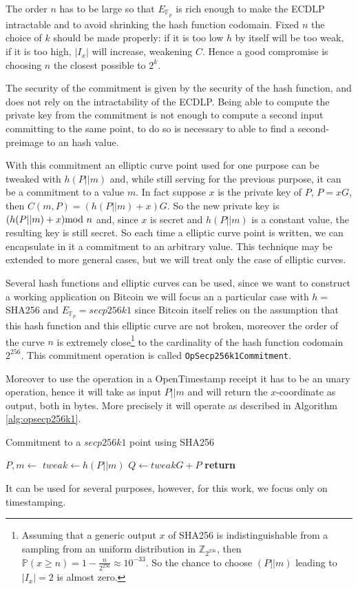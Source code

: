 The order $n$ has to be large so that $E_{\mathbb{F}_p}$ is rich enough to make the ECDLP intractable and to avoid shrinking the hash function codomain. Fixed $n$ the choice of $k$ should be made properly: if it is too low $h$ by itself will be too weak, if it is too high, $|I_x|$ will increase, weakening $C$. Hence a good compromise is choosing $n$ the closest possible to $2^k$.

The security of the commitment is given by the security of the hash function, and does not rely on the intractability of the ECDLP. Being able to compute the private key from the commitment is not enough to compute a second input committing to the same point, to do so is necessary to able to find a second-preimage to an hash value.

With this commitment an elliptic curve point used for one purpose can be tweaked with $h(P||m)$ and, while still serving for the previous purpose, it can be a commitment to a value $m$. In fact suppose $x$ is the private key of $P$, $P=xG$, then $C(m,P)=(h(P||m)+x)G$. So the new private key is $(h(P||m)+x) \textmd{mod } n$ and, since $x$ is secret and $h(P||m)$ is a constant value, the resulting key is still secret.
So each time a elliptic curve point is written, we can encapsulate in it a commitment to an arbitrary value.
This technique may be extended to more general cases, but we will treat only the case of elliptic curves.

Several hash functions and elliptic curves can be used, since we want to construct a working application on Bitcoin we will focus an a particular case with $h=$ SHA256 and $E_{\mathbb{F}_p}=secp256k1$ since Bitcoin itself relies on the assumption that this hash function and this elliptic curve are not broken, moreover the order of the curve $n$ is extremely close\footnote{Assuming that a generic output $x$ of SHA256 is indistinguishable from a sampling from an uniform distribution in $\mathbb{Z}_{2^{256}}$, then $\mathbb{P}(x\geq n)=1-\frac{n}{2^{256}}\approx 10^{-33}$. So the chance to choose $(P||m)$ leading to $|I_x|=2$ is almost zero.} 
to the cardinality of the hash function codomain $2^{256}$. This commitment operation is called \verb|OpSecp256k1Commitment|.

Moreover to use the operation in a OpenTimestamp receipt it has to be an unary operation, hence it will take as input $P||m$ and will return the $x$-coordinate as output, both in bytes. More precisely it will operate as described in Algorithm \ref{alg:opsecp256k1}.
\begin{algorithm}
	\caption{Commitment to a $secp256k1$ point using SHA256}
	\label{alg:opsecp256k1}
	\begin{algorithmic}[1]
	\State $P,m \gets$ 
	\State $tweak \gets h(P||m)$
	\State $Q \gets tweak G + P$
	\State \textbf{return} 
	\EndProcedure
	\end{algorithmic}
\end{algorithm}
It can be used for several purposes, however, for this work, we focus only on timestamping.

